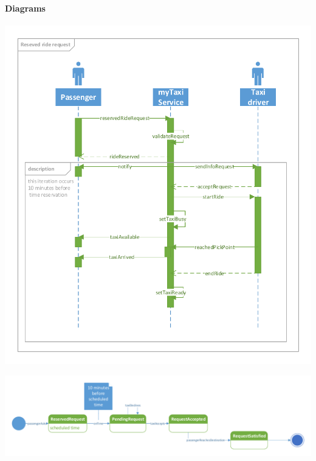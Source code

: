 	\paragraph{Diagrams}
		\begin{center}
	\includegraphics[width=\textwidth]{diagrams/reserved_request}
\end{center}
\begin{center}
	\includegraphics[width=\textwidth]{diagrams/reserved_state}
\end{center}

